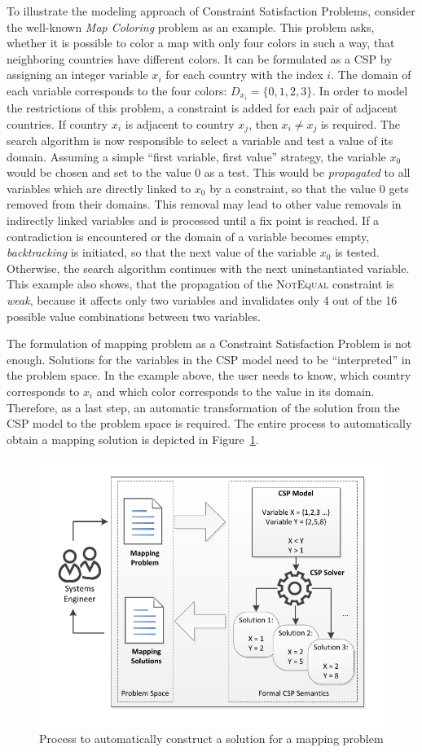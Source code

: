 \documentclass[english,biblatex]{lni}
\begin{document}
To illustrate the modeling approach of Constraint Satisfaction Problems, consider the well-known \emph{Map Coloring} problem as an example.
This problem asks, whether it is possible to color a map with only four colors in such a way, that neighboring countries have different colors.
It can be formulated as a CSP by assigning an integer variable $x_i$ for each country with the index $i$.
The domain of each variable corresponds to the four colors: $D_{x_i}=\{0,1,2,3\}$.
In order to model the restrictions of this problem, a constraint is added for each pair of adjacent countries.
If country $x_i$ is adjacent to country $x_j$, then $x_i \neq x_j$ is required.
The search algorithm is now responsible to select a variable and test a value of its domain.
Assuming a simple ``first variable, first value'' strategy, the variable $x_0$ would be chosen and set to the value $0$ as a test.
This would be \emph{propagated} to all variables which are directly linked to $x_0$ by a constraint, so that the value $0$ gets removed from their domains.
This removal may lead to other value removals in indirectly linked variables and is processed until a fix point is reached.
If a contradiction is encountered or the domain of a variable becomes empty, \emph{backtracking} is initiated, so that the next value of the variable $x_0$ is tested.
Otherwise, the search algorithm continues with the next uninstantiated variable.
This example also shows, that the propagation of the \textsc{NotEqual} constraint is \emph{weak}, because it affects only two variables and invalidates only 4 out of the 16 possible value combinations between two variables.

The formulation of mapping problem as a Constraint Satisfaction Problem is not enough. 
Solutions for the variables in the CSP model need to be ``interpreted'' in the problem space.
In the example above, the user needs to know, which country corresponds to $x_i$ and which color corresponds to the value in its domain.
Therefore, as a last step, an automatic transformation of the solution from the CSP model to the problem space is required.
The entire process to automatically obtain a mapping solution is depicted in Figure~\ref{fig:assist-process}.

\begin{figure}[htbp]
  \includegraphics[width=.5\textwidth]{assist-process}
  \caption{Process to automatically construct a solution for a mapping problem}
  \label{fig:assist-process}
\end{figure}
\end{document}
